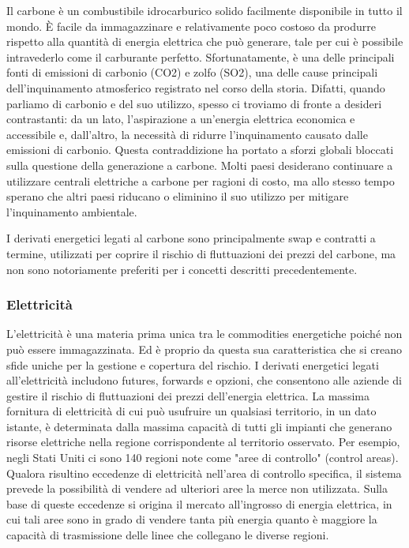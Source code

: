 \documentclass[12pt,a4paper]{report}
\begin{document}
Il carbone è un combustibile idrocarburico solido facilmente disponibile in tutto il mondo. È facile da immagazzinare e relativamente poco costoso da produrre rispetto alla quantità di energia elettrica che può generare, tale per cui è possibile intravederlo come il carburante perfetto. Sfortunatamente, è una delle principali fonti di emissioni di carbonio (CO2) e zolfo (SO2), una delle cause principali dell'inquinamento atmosferico registrato nel corso della storia. Difatti, quando parliamo di carbonio e del suo utilizzo, spesso ci troviamo di fronte a desideri contrastanti: da un lato, l'aspirazione a un'energia elettrica economica e accessibile e, dall'altro, la necessità di ridurre l'inquinamento causato dalle emissioni di carbonio. Questa contraddizione ha portato a sforzi globali bloccati sulla questione della generazione a carbone. Molti paesi desiderano continuare a utilizzare centrali elettriche a carbone per ragioni di costo, ma allo stesso tempo sperano che altri paesi riducano o eliminino il suo utilizzo per mitigare l'inquinamento ambientale.

I derivati energetici legati al carbone sono principalmente swap e contratti a termine, utilizzati per coprire il rischio di fluttuazioni dei prezzi del carbone, ma non sono notoriamente preferiti per i concetti descritti precedentemente.

\subsubsection{Elettricità}

L'elettricità è una materia prima unica tra le commodities energetiche poiché non può essere immagazzinata. Ed è proprio da questa sua caratteristica che si creano sfide uniche per la gestione e copertura del rischio. I derivati energetici legati all'elettricità includono futures, forwards e opzioni, che consentono alle aziende di gestire il rischio di fluttuazioni dei prezzi dell'energia elettrica.
La massima fornitura di elettricità di cui può usufruire un qualsiasi territorio, in un dato istante, è determinata dalla massima capacità di tutti gli impianti che generano risorse elettriche nella regione corrispondente al territorio osservato. 
Per esempio, negli Stati Uniti ci sono 140 regioni note come "aree di controllo" (control areas). Qualora risultino eccedenze di elettricità nell'area di controllo specifica, il sistema prevede la possibilità di vendere ad ulteriori aree la merce non utilizzata. Sulla base di queste eccedenze si origina il mercato all'ingrosso di energia elettrica, in cui tali aree sono in grado di vendere tanta più energia quanto è maggiore la capacità di trasmissione delle linee che collegano le diverse regioni.
\end{document}

